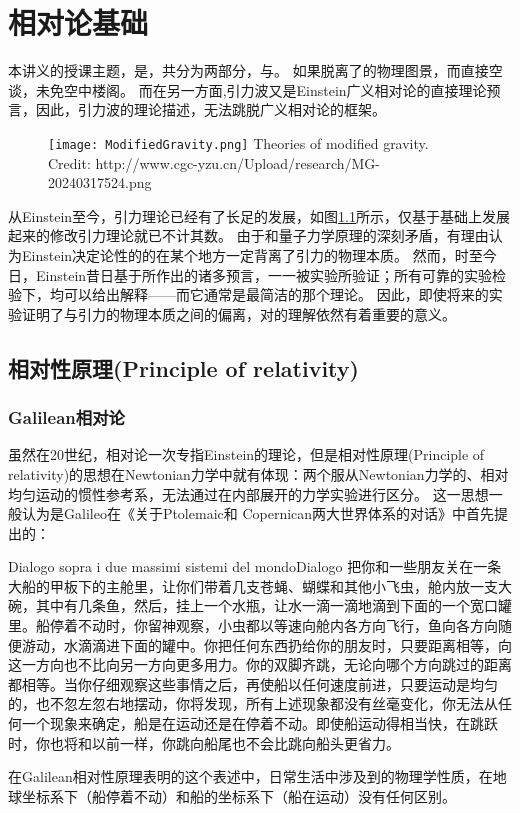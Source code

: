 \chapter{相对论基础}

本讲义的授课主题，是\gw\DA，共分为两部分，\emph{\gw}与\emph{\DA}。
如果脱离了\gw 的物理图景，而直接空谈\DA，未免空中楼阁。
而在另一方面,引力波又是Einstein广义相对论的直接理论预言，因此，引力波的理论描述，无法跳脱广义相对论的框架。

\begin{figure}[htp]
\centering
\texttt{[image: ModifiedGravity.png]}
  {Theories of modified gravity. Credit: http://www.cgc-yzu.cn/Upload/research/MG-20240317524.png}
\label{fig:ModGrav}
\end{figure}

从Einstein至今，引力理论已经有了长足的发展，如图\ref{fig:ModGrav}所示，仅基于\GR 基础上发展起来的修改引力理论就已不计其数。
由于和量子力学原理的深刻矛盾，有理由认为Einstein决定论性的的\GR 在某个地方一定背离了引力的物理本质。
然而，时至今日，Einstein昔日基于\GR 所作出的诸多预言，一一被实验所验证；所有可靠的实验检验下，\GR 均可以给出解释——而它通常是最简洁的那个理论。
因此，即使将来的实验证明了\GR 与引力的物理本质之间的偏离，对\GR 的理解依然有着重要的意义。

\section{相对性原理(Principle of relativity)}

\subsection{Galilean相对论}
虽然在20世纪，相对论一次专指Einstein的理论，但是相对性原理(Principle of relativity)的思想在Newtonian力学中就有体现：两个服从Newtonian力学的、相对均匀运动的惯性参考系，无法通过在内部展开的力学实验进行区分。
这一思想一般认为是Galileo在《关于Ptolemaic和 Copernican两大世界体系的对话》中首先提出的\cite{Fang:2012blog}：
\begin{myprop}{Dialogo sopra i due massimi sistemi del mondo}{Dialogo}
把你和一些朋友关在一条大船的甲板下的主舱里，让你们带着几支苍蝇、蝴蝶和其他小飞虫，舱内放一支大碗，其中有几条鱼，然后，挂上一个水瓶，让水一滴一滴地滴到下面的一个宽口罐里。船停着不动时，你留神观察，小虫都以等速向舱内各方向飞行，鱼向各方向随便游动，水滴滴进下面的罐中。你把任何东西扔给你的朋友时，只要距离相等，向这一方向也不比向另一方向更多用力。你的双脚齐跳，无论向哪个方向跳过的距离都相等。当你仔细观察这些事情之后，再使船以任何速度前进，只要运动是均匀的，也不忽左忽右地摆动，你将发现，所有上述现象都没有丝毫变化，你无法从任何一个现象来确定，船是在运动还是在停着不动。即使船运动得相当快，在跳跃时，你也将和以前一样，你跳向船尾也不会比跳向船头更省力。
\end{myprop}
在Galilean相对性原理表明的这个表述中，日常生活中涉及到的物理学性质，在地球坐标系下（船停着不动）和船的坐标系下（船在运动）没有任何区别。

